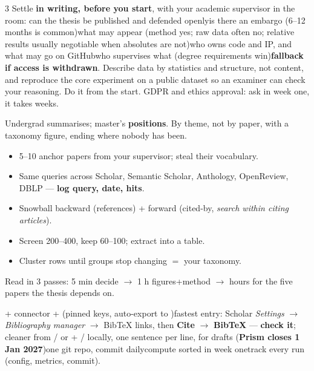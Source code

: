 \documentclass[10pt,a4paper]{article}
\begin{document}
\begin{multicols}{3}
Settle \textbf{in writing, before you start}, with your academic supervisor in
the room: can the thesis be published and defended openly\dt is there an
embargo (6--12 months is common)\dt what may appear (method yes; raw data
often no; relative results usually negotiable when absolutes are not)\dt who
owns code and IP, and what may go on GitHub\dt who supervises what (degree
requirements win)\dt \textbf{fallback if access is withdrawn}.
Describe data by statistics and
structure, not content, and reproduce the core experiment on a public dataset
so an examiner can check your reasoning. Do it from the start. GDPR and ethics
approval: ask in week one, it takes weeks.

Undergrad summarises; master's \textbf{positions}. By theme, not by paper,
with a taxonomy figure, ending where nobody has been.
\begin{itemize}
  \item 5--10 anchor papers from your supervisor; steal their vocabulary.
  \item Same queries across Scholar, Semantic Scholar, Anthology, OpenReview,
        DBLP --- \textbf{log query, date, hits}.
  \item Snowball backward (references) + forward (cited-by, \emph{search
        within citing articles}).
  \item Screen 200--400, keep 60--100; extract into a table.
  \item Cluster rows until groups stop changing $=$ your taxonomy.
\end{itemize}
Read in 3 passes: 5 min decide $\to$ 1 h figures+method $\to$ hours for the
five papers the thesis depends on.

 + connector +
 (pinned keys,
auto-export to )\dt fastest entry: Scholar \emph{Settings} $\to$
\emph{Bibliography manager} $\to$ BibTeX links, then \textbf{Cite} $\to$
\textbf{BibTeX} --- \textbf{check it}; cleaner from
 /  or
\dt
{} + / locally,
one sentence per line,  for drafts
(\textbf{Prism closes 1 Jan 2027})\dt one git repo, commit daily\dt compute
sorted in week one\dt track every run (config, metrics, commit).


\end{multicols}
\end{document}
